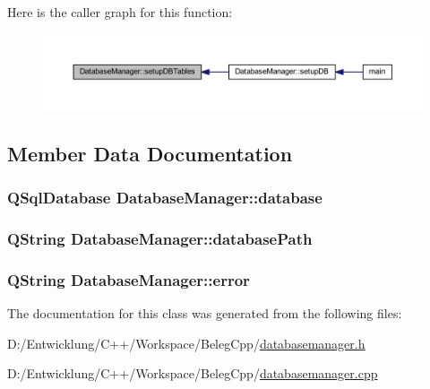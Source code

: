 Here is the caller graph for this function\+:\nopagebreak
\begin{figure}[H]
\begin{center}
\leavevmode
\includegraphics[width=350pt]{class_database_manager_ad3d4a41b420d52c57a2ef4f19b031904_icgraph}
\end{center}
\end{figure}




\subsection{Member Data Documentation}
\hypertarget{class_database_manager_ac59e194df96c891e617fcff06a56745b}{
\subsubsection[{database}]{\setlength{\rightskip}{0pt plus 5cm}Q\+Sql\+Database Database\+Manager\+::database\hspace{0.3cm}{\ttfamily [private]}}}\label{class_database_manager_ac59e194df96c891e617fcff06a56745b}
\hypertarget{class_database_manager_ac6e7c2d8a3d5603e83c0cd36cdb4e870}{
\subsubsection[{database\+Path}]{\setlength{\rightskip}{0pt plus 5cm}Q\+String Database\+Manager\+::database\+Path\hspace{0.3cm}{\ttfamily [private]}}}\label{class_database_manager_ac6e7c2d8a3d5603e83c0cd36cdb4e870}
\hypertarget{class_database_manager_aeac4d1f7e240732d413d6e7d74cbaef6}{
\subsubsection[{error}]{\setlength{\rightskip}{0pt plus 5cm}Q\+String Database\+Manager\+::error\hspace{0.3cm}{\ttfamily [private]}}}\label{class_database_manager_aeac4d1f7e240732d413d6e7d74cbaef6}


The documentation for this class was generated from the following files\+:\begin{DoxyCompactItemize}
\item 
D\+:/\+Entwicklung/\+C++/\+Workspace/\+Beleg\+Cpp/\hyperlink{databasemanager_8h}{databasemanager.\+h}\item 
D\+:/\+Entwicklung/\+C++/\+Workspace/\+Beleg\+Cpp/\hyperlink{databasemanager_8cpp}{databasemanager.\+cpp}\end{DoxyCompactItemize}
